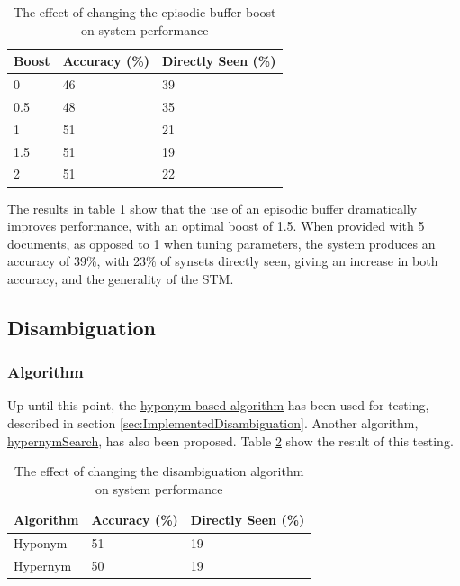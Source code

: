 \documentclass[]{article}
\begin{document}
\begin{table}
\begin{center}
\begin{tabular}{|p{2em}|p{7em}|p{7em}|}
	\hline
	Boost & Accuracy (\%) & Directly Seen (\%) \\
	\hline
	0 & 46 & 39\\
	\hline
	0.5 & 48 & 35\\
	\hline
	1 & 51 & 21\\
	\hline
	1.5 & 51 & 19\\
	\hline
	2 & 51 & 22\\
	\hline
\end{tabular}
\end{center}
\caption{The effect of changing the episodic buffer boost on system performance}
\label{table:EBboost}
\end{table}

The results in table \ref{table:EBboost} show that the use of an episodic buffer dramatically improves performance, with an optimal boost of 1.5. When provided with 5 documents, as opposed to 1 when tuning parameters, the system produces an accuracy of 39\%, with 23\% of synsets directly seen, giving an increase in both accuracy, and the generality of the STM. 

\subsection{Disambiguation}
\label{sec:EvDisambiguation}


\subsubsection{Algorithm}
\label{sec:EvDisAlgorithm}
Up until this point, the \hyperref[lst:hyponymSearch]{hyponym based algorithm} has been used for testing, described in section \ref{sec:ImplementedDisambiguation}. Another algorithm, \hyperref[lst:hypernymSearch]{hypernymSearch}, has also been proposed. Table \ref{table:Algorithm} show the result of this testing.

\begin{table}
\begin{center}
\begin{tabular}{|p{7em}|p{7em}|p{7em}|}
	\hline
	Algorithm & Accuracy (\%) & Directly Seen (\%) \\
	\hline
	Hyponym & 51 & 19\\
	\hline
	Hypernym & 50 & 19\\
	\hline
\end{tabular}
\end{center}
\caption{The effect of changing the disambiguation algorithm on system performance}
\label{table:Algorithm}
\end{table}
\end{document}
